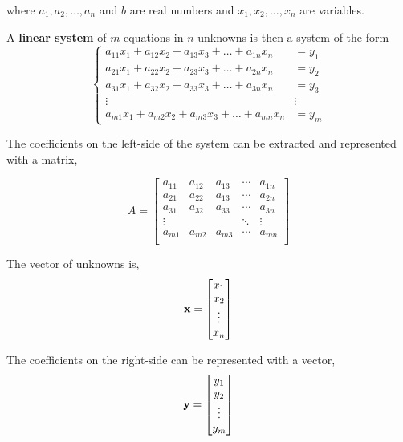 where $a_1, a_2, \dots, a_n$ and $b$ are real numbers and $x_1, x_2, \dots, x_n$ are variables. 
 

 \begin{tcolorbox}[colback=yellow!10!,colframe=gray!15!]

A \textbf{linear system} of $m$ equations in $n$ unknowns is then a system of the form
\[ 
\begin{cases} 
a_{11} x_1 + a_{12} x_2 + a_{13} x_3 + \dots + a_{1n} x_n &= y_1\\
 a_{21} x_1 + a_{22} x_2 + a_{23} x_3 + \dots + a_{2n} x_n &= y_2\\
a_{31} x_1 + a_{32} x_2 + a_{33} x_3 + \dots + a_{3n} x_n &= y_3\\

\vdots      &\vdots \\

a_{m1} x_1 + a_{m2} x_2 + a_{m3} x_3 + \dots + a_{mn} x_n &= y_m
\end{cases}
 \]
 \end{tcolorbox} 


The coefficients on the left-side of the system can be extracted and represented with a matrix, 

\[ 
A =  \begin{bmatrix} 
	a_{11} & a_{12} & a_{13}	& \cdots & a_{1n} \\
 	a_{21} & a_{22} & a_{13}	& \cdots & a_{2n} \\
  	a_{31} & a_{32} & a_{33}	& \cdots & a_{3n} \\
	\vdots 	&	&	& \ddots & \vdots \\
    	a_{m1} & a_{m2} & a_{m3}	& \cdots & a_{mn} \\
    \end{bmatrix}  
 \]


The vector of unknowns is, 
\[ 
{\bf x} = \begin{bmatrix} x_1 \\ x_2 \\ \vdots \\ x_n \end{bmatrix}
\]



The coefficients on the right-side can be represented with a vector, 
\[ 
{\bf y} = \begin{bmatrix} y_1 \\ y_2 \\ \vdots \\ y_m \end{bmatrix}
\]



